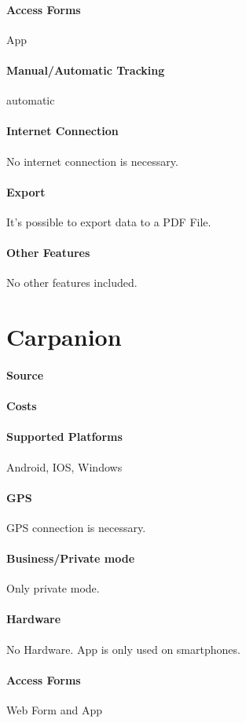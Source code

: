 \paragraph{Access Forms} App
\paragraph{Manual/Automatic Tracking} automatic
\paragraph{Internet Connection} No internet connection is necessary.
\paragraph{Export} It’s possible to export data to a PDF File.
\paragraph{Other Features} No other features included.
\newpage
\section{Carpanion}
\paragraph{Source} 
\paragraph{Costs} 
\paragraph{Supported Platforms} Android, IOS, Windows
\paragraph{GPS} GPS connection is necessary.
\paragraph{Business/Private mode} Only private mode.
\paragraph{Hardware} No Hardware. App is only used on smartphones.
\paragraph{Access Forms}Web Form and App
